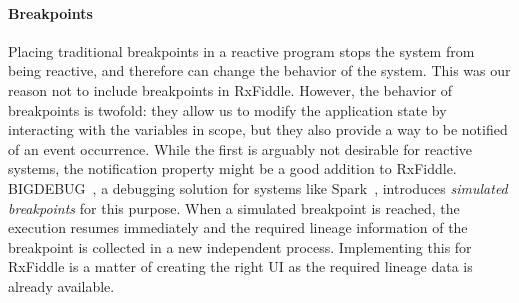 \paragraph{Breakpoints}%
\label{breakpoints} Placing traditional breakpoints in a reactive
program stops the system from being reactive, and therefore can change
the behavior of the system.  This was our reason not to include
breakpoints in RxFiddle.  However, the behavior of breakpoints is
twofold:  they allow us to modify the application state by interacting
with the variables in scope, but they also provide a way to be notified
of an event occurrence.  While the first is arguably not desirable for
reactive systems, the notification property might be a good addition to
RxFiddle.  BIGDEBUG~\cite{Gulzar2016}, a debugging solution for systems
like Spark~\cite{zaharia2012resilient}, introduces \textit{simulated
breakpoints} for this purpose.  When a simulated breakpoint is reached,
the execution resumes immediately and the required lineage information
of the breakpoint is collected in a new independent process.
Implementing this for RxFiddle is a matter of creating the right UI as
the required lineage data is already available.

